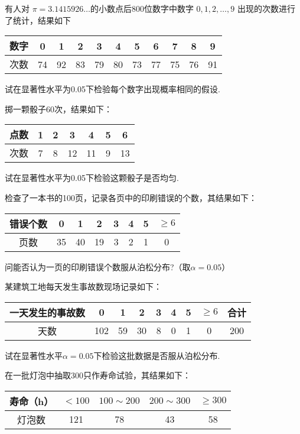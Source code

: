 \begin{xiti}
	\item 有人对 $\pi =3.1415926\dotsc $的小数点后800位数字中数字 $0,1,2,\dotsc,9$ 出现的次数进行了统计，结果如下
	
	\begin{table}[!htp]
		\centering
\begin{tabular}{c|cccccccccc}
	数字&0&1&2&3&4&5&6&7&8&9\\
			\midrule
	次数&74&92&83&79&80&73&77&75&76&91
		\end{tabular}
	\end{table}

试在显著性水平为0.05下检验每个数字出现概率相同的假设.

\item 掷一颗骰子60次，结果如下：
\begin{table}[!htp]
	\centering
	\begin{tabular}{c|cccccc}
		点数&1&2&3&4&5&6\\
		\midrule
		次数&7&8&12&11&9&13
	\end{tabular}
\end{table}

试在显著性水平为0.05下检验这颗骰子是否均匀.
\item 检查了一本书的100页，记录各页中的印刷错误的个数，其结果如下：
\begin{table}[!htp]
	\centering
	\begin{tabular}{c|ccccccc}
		错误个数&0&1&2&3&4&5&$\geq 6$\\
		\midrule
		页数&35&40&19&3&2&1&0
	\end{tabular}
\end{table}
问能否认为一页的印刷错误个数服从泊松分布?（取$\alpha=0.05$）

\item 某建筑工地每天发生事故数现场记录如下：
\begin{table}[!htp]
	\centering
	\begin{tabular}{c|cccccccc}
		一天发生的事故数&0&1&2&3&4&5&$\geq 6$&合计\\
		\midrule
		天数&102&59&30&8&0&1&0&200
	\end{tabular}
\end{table}
试在显著性水平$\alpha=0.05$下检验这批数据是否服从泊松分布.

\item 在一批灯泡中抽取300只作寿命试验，其结果如下：
\begin{table}[!htp]
	\centering
	\begin{tabular}{c|cccc}
		寿命（h） & $<100$ & $100 \sim200$ & $200\sim 300$ & $\geq 300$\\
		\midrule
		灯泡数 & 121 & 78 & 43 & 58
	\end{tabular}
\end{table}


\end{xiti}
